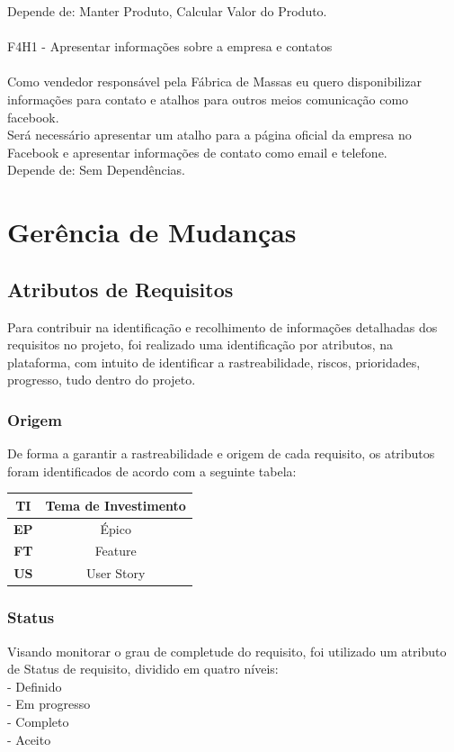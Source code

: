 \tab Depende de: Manter Produto, Calcular Valor do Produto.\\
\\
\tab F4H1 - Apresentar informações sobre a empresa e contatos\\
\\
\tab Como vendedor responsável pela Fábrica de Massas eu quero disponibilizar informações para contato e atalhos para outros meios comunicação como facebook.\\
\tab Será necessário apresentar um atalho para a página oficial da empresa no Facebook e apresentar informações de contato como email e telefone.\\
\tab Depende de: Sem Dependências.\\

\section{Gerência de Mudanças}

\subsection {Atributos de Requisitos}

Para  contribuir na identificação e recolhimento de informações detalhadas dos requisitos no projeto, foi realizado uma identificação por atributos, na plataforma, com intuito de identificar a rastreabilidade, riscos, prioridades, progresso, tudo dentro do projeto. \\

\subsubsection{Origem}
De forma a garantir a rastreabilidade e origem de cada requisito, os atributos foram identificados de acordo com a seguinte tabela:\\

\begin{tabular}{|c|c|}
  \hline
  \textbf{TI} & Tema de Investimento \\ \hline
  \textbf{EP} & Épico \\ \hline
  \textbf{FT} & Feature \\ \hline
  \textbf{US} & User Story \\ \hline
\end{tabular}

\subsubsection{Status}
Visando monitorar o grau de completude do requisito, foi utilizado um atributo de Status de requisito, dividido em quatro níveis: \\
\tab - Definido\\
\tab - Em progresso\\
\tab - Completo\\
\tab - Aceito\\

